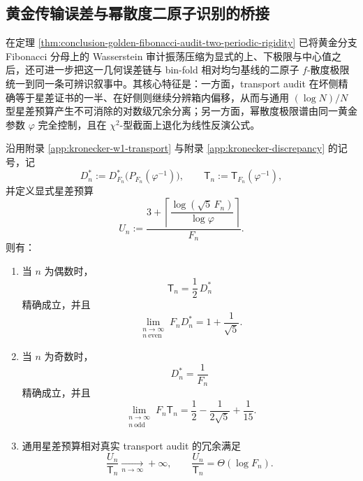 \subsection{黄金传输误差与幂散度二原子识别的桥接}\label{subsec:conclusion-golden-transport-powerdivergence-bridge}
在定理 \ref{thm:conclusion-golden-fibonacci-audit-two-periodic-rigidity} 已将黄金分支 Fibonacci 分母上的 Wasserstein 审计振荡压缩为显式的上、下极限与中心值之后，还可进一步把这一几何误差链与 bin-fold 相对均匀基线的二原子 \(f\)-散度极限统一到同一条可辨识叙事中。其核心特征是：一方面，transport audit 在坏侧精确等于星差证书的一半、在好侧则继续分辨箱内偏移，从而与通用 \((\log N)/N\) 型星差预算产生不可消除的对数级冗余分离；另一方面，幂散度极限谱由同一黄金参数 \(\varphi\) 完全控制，且在 \(\chi^2\)-型截面上退化为线性反演公式。

\begin{theorem}\label{thm:conclusion-golden-transport-star-log-overhead}
沿用附录 \ref{app:kronecker-w1-transport} 与附录 \ref{app:kronecker-discrepancy} 的记号，记
\[
D_n^\ast:=D_{F_n}^\ast\!\bigl(P_{F_n}(\varphi^{-1})\bigr),
\qquad
\mathsf T_n:=\mathsf T_{F_n}(\varphi^{-1}),
\]
并定义显式星差预算
\[
U_n:=\frac{3+\left\lceil \dfrac{\log(\sqrt5\,F_n)}{\log\varphi}\right\rceil}{F_n}.
\]
则有：
\begin{enumerate}
  \item 当 \(n\) 为偶数时，
  \[
  \mathsf T_n=\frac12\,D_n^\ast
  \]
  精确成立，并且
  \[
  \boxed{\;
  \lim_{\substack{n\to\infty\\ n\ \mathrm{even}}}F_nD_n^\ast
  =
  1+\frac{1}{\sqrt5}.\;}
  \]
  \item 当 \(n\) 为奇数时，
  \[
  D_n^\ast=\frac1{F_n}
  \]
  精确成立，并且
  \[
  \boxed{\;
  \lim_{\substack{n\to\infty\\ n\ \mathrm{odd}}}F_n\mathsf T_n
  =
  \frac12-\frac{1}{2\sqrt5}+\frac1{15}.\;}
  \]
  \item 通用星差预算相对真实 transport audit 的冗余满足
  \[
  \boxed{\;
  \frac{U_n}{\mathsf T_n}\xrightarrow[n\to\infty]{}+\infty,
  \qquad
  \frac{U_n}{\mathsf T_n}=\Theta(\log F_n).\;}
  \]
\end{enumerate}
\end{theorem}
